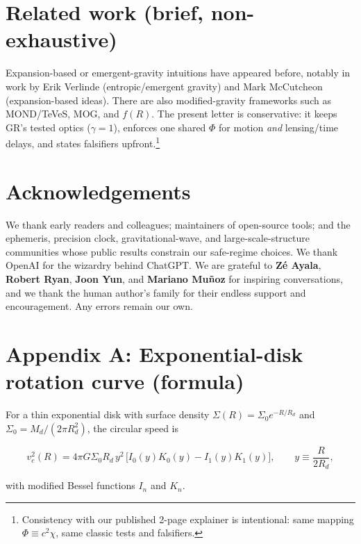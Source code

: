 \documentclass[
]{article}
\begin{document}
\section{Related work (brief,
non-exhaustive)}\label{related-work-brief-non-exhaustive-1}

Expansion-based or emergent-gravity intuitions have appeared before,
notably in work by Erik Verlinde (entropic/emergent gravity) and Mark
McCutcheon (expansion-based ideas). There are also modified-gravity
frameworks such as MOND/TeVeS, MOG, and \(f(R)\). The present letter is
conservative: it keeps GR's tested optics (\(\gamma = 1\)), enforces one
shared \(\Phi\) for motion \emph{and} lensing/time delays, and states
falsifiers upfront.\footnote{Consistency with our published 2-page
  explainer is intentional: same mapping \(\Phi \equiv c^{2}\chi\), same
  classic tests and falsifiers.}

\section{Acknowledgements}\label{acknowledgements}

We thank early readers and colleagues; maintainers of open-source tools;
and the ephemeris, precision clock, gravitational-wave, and
large-scale-structure communities whose public results constrain our
safe-regime choices. We thank OpenAI for the wizardry behind ChatGPT. We
are grateful to \textbf{Zé Ayala}, \textbf{Robert Ryan}, \textbf{Joon
Yun}, and \textbf{Mariano Muñoz} for inspiring conversations, and we
thank the human author's family for their endless support and
encouragement. Any errors remain our own.

\section{Appendix A: Exponential-disk rotation curve
(formula)}\label{appendix-a-exponential-disk-rotation-curve-formula}

For a thin exponential disk with surface density
\(\Sigma(R) = \Sigma_{0}e^{- R/R_{d}}\) and
\(\Sigma_{0} = M_{d}/(2\pi R_{d}^{2})\), the circular speed is

\[v_{c}^{2}(R) = 4\pi G\Sigma_{0}R_{d}\, y^{2}\,\lbrack I_{0}(y)K_{0}(y) - I_{1}(y)K_{1}(y)\rbrack,\quad\quad y \equiv \frac{R}{2R_{d}},\]

with modified Bessel functions \(I_{n}\) and \(K_{n}\).
\end{document}
